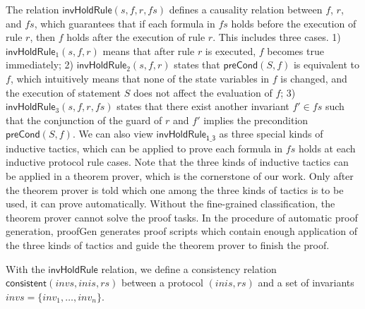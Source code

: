 \documentclass[conference]{IEEEtran}
\begin{document}
{The relation $\mathsf{invHoldRule}(s, f,r,fs)$ defines a causality relation
between $f$, $r$, and $fs$, which guarantees that if each formula in $fs$ holds
before the execution of rule $r$, then $f$ holds after the execution of rule $r$. This includes three cases. 1) $\mathsf{invHoldRule}_1(s,f, r)$ means that after rule $r$ is executed, $f$ becomes true immediately;   2) $\mathsf{invHoldRule}_2(s,f, r)$ states that $\mathsf{preCond}(S,f)$ is equivalent to $f$, which intuitively means that none of the state variables in $f$ is changed, and the execution of statement $S$ does not affect the evaluation of $f$;
 3) $\mathsf{invHoldRule}_3(s,f, r,fs)$ states that there exist another invariant $f' \in fs$ such that
  the conjunction of the guard of $r$ and $f'$ implies the precondition  $\mathsf{preCond}(S,f)$.
We can also view $\mathsf{invHoldRule_{1\_3}}$ as three
special kinds of inductive tactics, which can be applied to prove
each formula in $fs$ holds at each inductive protocol rule cases. Note that the three kinds of inductive tactics can be applied in a theorem prover, which is the cornerstone of our work. Only after the theorem prover is told which one among the three kinds of  tactics is to be used, it can prove automatically. Without the fine-grained classification, the theorem prover cannot solve the proof tasks. In the procedure of automatic proof generation,  {\sf proofGen}  generates proof scripts which contain enough application of the three kinds of  tactics and guide the theorem prover to finish the proof.

With the $\mathsf{invHoldRule}$ relation, we define a consistency relation $\mathsf{consistent}( invs,inis, rs)$ between a protocol $(inis,rs)$ and a set of invariants $invs=\{inv_1,\ldots, inv_n\}$.

}
\end{document}
